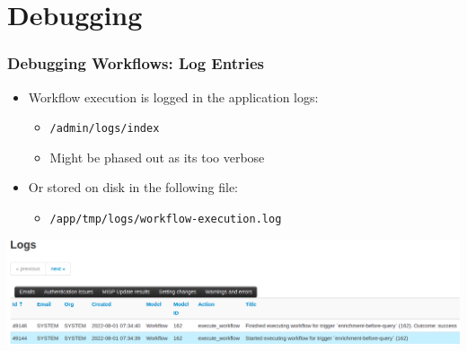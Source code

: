 \section{Debugging}
\begin{frame}
    \frametitle{Debugging Workflows: Log Entries}
    \begin{itemize}
        \item Workflow execution is logged in the application logs:
        \begin{itemize}
            \item \texttt{/admin/logs/index}
            \item {} Might be phased out as its too verbose
        \end{itemize}
        \item Or stored on disk in the following file:
        \begin{itemize}
            \item \texttt{/app/tmp/logs/workflow-execution.log}
        \end{itemize}
    \end{itemize}
    \begin{center}
        \includegraphics[width=1.0\linewidth]{pictures/workflow-debug.png}
    \end{center}
\end{frame}

